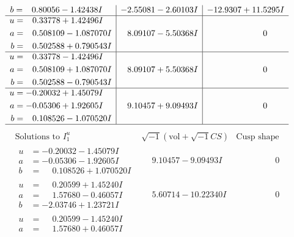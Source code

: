 \documentclass[1p]{elsarticle_modified}
\theoremstyle{definition}
\newcommand{\I}{\sqrt{-1}}
\begin{document}
$$\begin{array}{c|c|c}
\begin{aligned}
b &= \phantom{-}0.80056 - 1.42438 I\end{aligned}
 & -2.55081 - 2.60103 I & -12.9307 + 11.5295 I \\ \hline\begin{aligned}
u &= \phantom{-}0.33778 + 1.42496 I \\
a &= \phantom{-}0.508109 - 1.087070 I \\
b &= \phantom{-}0.502588 + 0.790543 I\end{aligned}
 & \phantom{-}8.09107 - 5.50368 I & \phantom{-0.000000 } 0 \\ \hline\begin{aligned}
u &= \phantom{-}0.33778 - 1.42496 I \\
a &= \phantom{-}0.508109 + 1.087070 I \\
b &= \phantom{-}0.502588 - 0.790543 I\end{aligned}
 & \phantom{-}8.09107 + 5.50368 I & \phantom{-0.000000 } 0 \\ \hline\begin{aligned}
u &= -0.20032 + 1.45079 I \\
a &= -0.05306 + 1.92605 I \\
b &= \phantom{-}0.108526 - 1.070520 I\end{aligned}
 & \phantom{-}9.10457 + 9.09493 I & \phantom{-0.000000 } 0\\
 \hline 
 \end{array}$$\newpage$$\begin{array}{c|c|c}  
\text{Solutions to }I^u_{1}& \I (\text{vol} + \sqrt{-1}CS) & \text{Cusp shape}\\
 \hline 
\begin{aligned}
u &= -0.20032 - 1.45079 I \\
a &= -0.05306 - 1.92605 I \\
b &= \phantom{-}0.108526 + 1.070520 I\end{aligned}
 & \phantom{-}9.10457 - 9.09493 I & \phantom{-0.000000 } 0 \\ \hline\begin{aligned}
u &= \phantom{-}0.20599 + 1.45240 I \\
a &= \phantom{-}1.57680 - 0.46057 I \\
b &= -2.03746 + 1.23721 I\end{aligned}
 & \phantom{-}5.60714 - 10.22340 I & \phantom{-0.000000 } 0 \\ \hline\begin{aligned}
u &= \phantom{-}0.20599 - 1.45240 I \\
a &= \phantom{-}1.57680 + 0.46057 I \\

\end{aligned}
\end{array}$$
\end{document}
